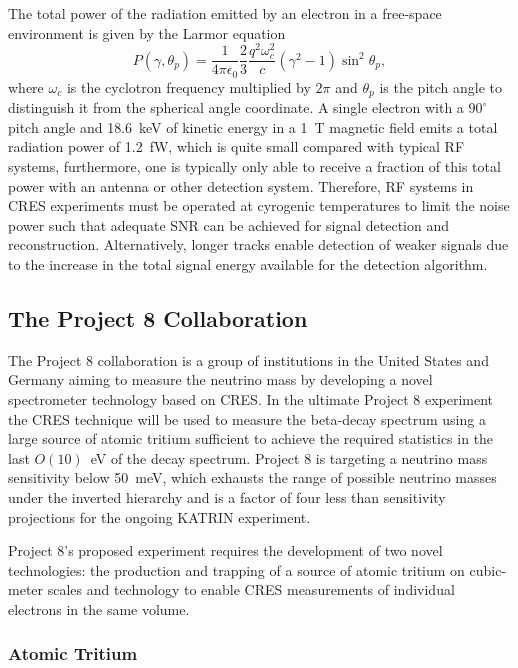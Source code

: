 The total power of the radiation emitted by an electron in a free-space environment is given by the Larmor equation
\begin{equation}
    P(\gamma, \theta_p)=\frac{1}{4\pi\epsilon_0}\frac{2}{3}\frac{q^2\omega_c^2}{c}(\gamma^2 - 1)\sin^2{\theta_p},
\end{equation}
where $\omega_c$ is the cyclotron frequency multiplied by $2\pi$ and $\theta_p$ is the pitch angle to distinguish it from the spherical angle coordinate. A single electron with a $90^\circ$ pitch angle and 18.6~keV of kinetic energy in a 1~T magnetic field emits a total radiation power of 1.2~fW, which is quite small compared with typical RF systems, furthermore, one is typically only able to receive a fraction of this total power with an antenna or other detection system. Therefore, RF systems in CRES experiments must be operated at cyrogenic temperatures to limit the noise power such that adequate SNR can be achieved for signal detection and reconstruction. Alternatively, longer tracks enable detection of weaker signals due to the increase in the total signal energy available for the detection algorithm.

\subsection{The Project 8 Collaboration}

The Project 8 collaboration is a group of institutions in the United States and Germany aiming to measure the neutrino mass by developing a novel spectrometer technology based on CRES. In the ultimate Project 8 experiment the CRES technique will be used to measure the beta-decay spectrum using a large source of atomic tritium sufficient to achieve the required statistics in the last $O(10)$~eV of the decay spectrum. Project 8 is targeting a neutrino mass sensitivity below 50~meV, which exhausts the range of possible neutrino masses under the inverted hierarchy and is a factor of four less than sensitivity projections for the ongoing KATRIN experiment.

Project 8's proposed experiment requires the development of two novel technologies: the production and trapping of a source of atomic tritium on cubic-meter scales and technology to enable CRES measurements of individual electrons in the same volume. 

\subsubsection*{Atomic Tritium}

